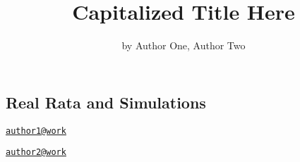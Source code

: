 \title{Capitalized Title Here}
\author{by Author One, Author Two}

\maketitle


\hypertarget{real-rata-and-simulations}{%
\subsection{Real Rata and Simulations}\label{real-rata-and-simulations}}




\address{%
Author One\\
Affiliation\\
line 1\\ line 2\\
}
\href{mailto:author1@work}{\nolinkurl{author1@work}}

\address{%
Author Two\\
Affiliation\\
line 1\\ line 2\\
}
\href{mailto:author2@work}{\nolinkurl{author2@work}}


